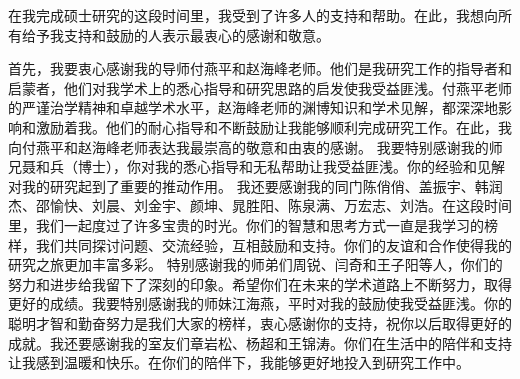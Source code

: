 
\acknowledgments







在我完成硕士研究的这段时间里，我受到了许多人的支持和帮助。在此，我想向所有给予我支持和鼓励的人表示最衷心的感谢和敬意。

首先，我要衷心感谢我的导师付燕平和赵海峰老师。他们是我研究工作的指导者和启蒙者，他们对我学术上的悉心指导和研究思路的启发使我受益匪浅。付燕平老师的严谨治学精神和卓越学术水平，赵海峰老师的渊博知识和学术见解，都深深地影响和激励着我。他们的耐心指导和不断鼓励让我能够顺利完成研究工作。在此，我向付燕平和赵海峰老师表达我最崇高的敬意和由衷的感谢。
我要特别感谢我的师兄聂和兵（博士），你对我的悉心指导和无私帮助让我受益匪浅。你的经验和见解对我的研究起到了重要的推动作用。
我还要感谢我的同门陈俏俏、盖振宇、韩润杰、邵愉快、刘晨、刘金宇、颜坤、晁胜阳、陈泉满、万宏志、刘浩。在这段时间里，我们一起度过了许多宝贵的时光。你们的智慧和思考方式一直是我学习的榜样，我们共同探讨问题、交流经验，互相鼓励和支持。你们的友谊和合作使得我的研究之旅更加丰富多彩。
特别感谢我的师弟们周锐、闫奇和王子阳等人，你们的努力和进步给我留下了深刻的印象。希望你们在未来的学术道路上不断努力，取得更好的成绩。我要特别感谢我的师妹江海燕，平时对我的鼓励使我受益匪浅。你的聪明才智和勤奋努力是我们大家的榜样，衷心感谢你的支持，祝你以后取得更好的成就。我还要感谢我的室友们章岩松、杨超和王锦涛。你们在生活中的陪伴和支持让我感到温暖和快乐。在你们的陪伴下，我能够更好地投入到研究工作中。

